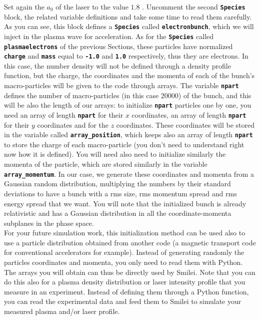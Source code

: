 \documentclass{article}
\newcommand{\smilei}{{\sc Smilei}\xspace}
\newcommand{\commandline}[1]{\texttt{\textbf{#1}}}
\begin{document}
Set again the $a_0$ of the laser to  the value $1.8$ . Uncomment the second \commandline{Species} block, the related variable definitions and take some time to read them carefully. As you can see, this block defines a \commandline{Species} called \commandline{electronbunch}, which we will inject in the plasma wave for acceleration. As for the \commandline{Species} called \commandline{plasmaelectrons} of the previous  Sections, these particles have normalized \commandline{charge} and \commandline{mass} equal to \commandline{-1.0} and \commandline{1.0} respectively, thus they are electrons. In this case,  the number density will not be defined through a density profile function, but the charge, the coordinates and the momenta of each of the bunch's macro-particles will be given to the code through arrays. The variable \commandline{npart} defines the number of macro-particles (in  this case 20000) of the bunch, and this will be also the length of our arrays: to initialize \commandline{npart} particles one by one, you need an array of length \commandline{npart} for their $x$ coordinates, an array of length \commandline{npart} for their $y$ coordinates and for the $z$ coordinates. These coordinates will be stored in the variable called \commandline{array\_position}, which keeps also an array of length \commandline{npart} to store the charge of each macro-particle (you don't need to understand right now how it is defined). You will need also need to initialize similarly the momenta of the particle, which are stored similarly in the variable \commandline{array\_momentum}. In our case, we generate these coordinates and momenta from a Gaussian random distribution, multiplying the numbers by their standard deviations to have a bunch with a rms size, rms momentum spread and rms energy spread that we want. You will note that the initialized bunch is already relativistic and has a Gaussian distribution in all the coordinate-momenta subplanes in the phase space.\\

For your future  simulation work, this initialization method can be used also to use a particle distribution obtained from another code (a magnetic transport code for conventional accelerators for example). Instead of generating randomly the particles coordinates and momenta, you only need to read them with Python. The arrays you will obtain can thus be directly used by \smilei. Note that you can do this also for a plasma density distribution or laser intensity profile that you measure in an experiment. Instead of defining them through a Python function, you  can read the experimental data and feed them to \smilei to simulate your measured plasma and/or laser profile.\\
\end{document}
